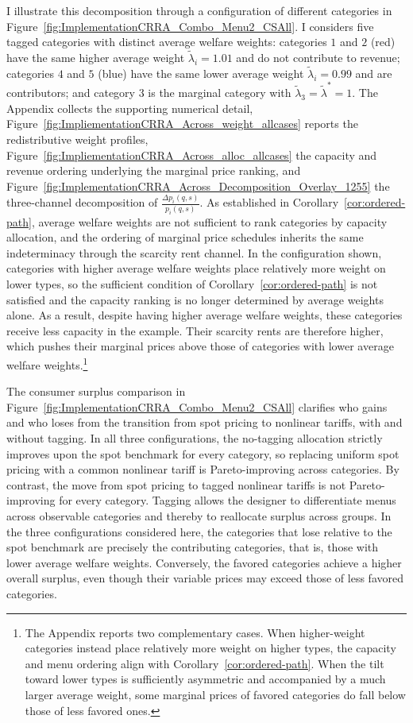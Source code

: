 \documentclass{class}
\begin{document}
I illustrate this decomposition through a configuration of different categories in Figure~\ref{fig:ImplementationCRRA_Combo_Menu2_CSAll}. I considers five tagged categories with distinct average welfare weights: categories \(1\) and \(2\) (red) have the same higher average weight \(\tilde\lambda_i=1.01\) and do not contribute to revenue; categories \(4\) and \(5\) (blue) have the same lower average weight \(\tilde\lambda_i=0.99\) and are contributors; and category \(3\) is the marginal category with \(\tilde\lambda_3=\tilde\lambda^\ast = 1\). The Appendix collects the supporting numerical detail, Figure~\ref{fig:ImpliementationCRRA_Across_weight_allcases} reports the redistributive weight profiles, Figure~\ref{fig:ImpliementationCRRA_Across_alloc_allcases} the capacity and revenue ordering underlying the marginal price ranking, and Figure~\ref{fig:ImplementationCRRA_Across_Decomposition_Overlay_1255} the three-channel decomposition of $\frac{\Delta p_i(q,s)}{p_i(q,s)}$. As established in Corollary~\ref{cor:ordered-path}, average welfare weights are not sufficient to rank categories by capacity allocation, and the ordering of marginal price schedules inherits the same indeterminacy through the scarcity rent channel. In the configuration shown, categories with higher average welfare weights place relatively more weight on lower types, so the sufficient condition of Corollary~\ref{cor:ordered-path} is not satisfied and the capacity ranking is no longer determined by average weights alone. As a result, despite having higher average welfare weights, these categories receive less capacity in the example. Their scarcity rents are therefore higher, which pushes their marginal prices above those of categories with lower average welfare weights.\footnote{The Appendix reports two complementary cases. When higher-weight categories instead place relatively more weight on higher types, the capacity and menu ordering align with Corollary~\ref{cor:ordered-path}. When the tilt toward lower types is sufficiently asymmetric and accompanied by a much larger average weight, some marginal prices of favored categories do fall below those of less favored ones.}

The consumer surplus comparison in Figure~\ref{fig:ImplementationCRRA_Combo_Menu2_CSAll} clarifies who gains and who loses from the transition from spot pricing to nonlinear tariffs, with and without tagging. In all three configurations, the no-tagging allocation strictly improves upon the spot benchmark for every category, so replacing uniform spot pricing with a common nonlinear tariff is Pareto-improving across categories. By contrast, the move from spot pricing to tagged nonlinear tariffs is not Pareto-improving for every category. Tagging allows the designer to differentiate menus across observable categories and thereby to reallocate surplus across groups. In the three configurations considered here, the categories that lose relative to the spot benchmark are precisely the contributing categories, that is, those with lower average welfare weights. Conversely, the favored categories achieve a higher overall surplus, even though their variable prices may exceed those of less favored categories.
\end{document}
